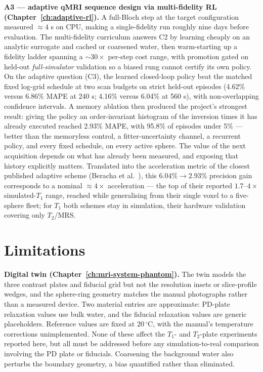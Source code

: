 \textbf{A3 --- adaptive qMRI sequence design via multi-fidelity RL
(Chapter~\ref{ch:adaptive-rl}).} A full-Bloch step at the target
configuration measured ${\approx}4$ s on CPU, making a single-fidelity run
roughly nine days before evaluation. The multi-fidelity curriculum answers
C2 by learning cheaply on an analytic surrogate and cached or coarsened
water, then warm-starting up a fidelity ladder spanning a ${\sim}30\times$
per-step cost range, with promotion gated on held-out \emph{full-simulator}
validation so a biased rung cannot certify its own policy. On the adaptive
question (C3), the learned closed-loop policy beat the matched fixed log-grid
schedule at two scan budgets on strict held-out episodes (4.62\% versus
6.86\% MAPE at 240 s; 4.16\% versus 6.04\% at 560 s), with non-overlapping
confidence intervals. A memory ablation then produced the project's strongest
result: giving the policy an order-invariant histogram of the inversion times
it has already executed reached 2.93\% MAPE, with 95.8\% of episodes under
5\% --- better than the memoryless control, a fitter-uncertainty channel, a
recurrent policy, and every fixed schedule, on every active sphere. The value of the next acquisition depends
on what has already been measured, and exposing that history explicitly
matters. Translated into the acceleration metric of the closest published
adaptive scheme (Beracha et al.~\cite{adaptive_mri:23}), this
$6.04\%\!\to\!2.93\%$ precision gain corresponds to a nominal ${\approx}4\times$
acceleration --- the top of their reported $1.7$--$4\times$ simulated-$T_1$
range, reached while generalising from their single voxel to a five-sphere
fleet; for $T_1$ both schemes stay in simulation, their hardware validation
covering only $T_2$/MRS.

\section{Limitations}
\label{sec:concl-limitations}

\textbf{Digital twin (Chapter~\ref{ch:mri-system-phantom}).} The twin models
the three contrast plates and fiducial grid but not the resolution insets or
slice-profile wedges, and the sphere-ring geometry matches the manual
photographs rather than a measured device. Two material entries are
approximate: PD-plate relaxation values use bulk water, and the fiducial
relaxation values are generic placeholders. Reference values are fixed at
$20\,^{\circ}$C, with the manual's temperature corrections unimplemented.
None of these affect the $T_1$- and $T_2$-plate experiments reported here,
but all must be addressed before any simulation-to-real comparison involving
the PD plate or fiducials. Coarsening the background water also perturbs the
boundary geometry, a bias quantified rather than eliminated.

